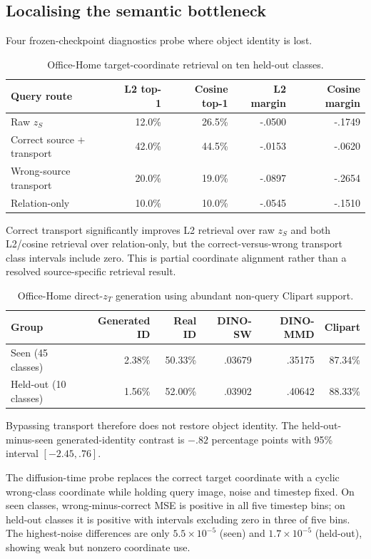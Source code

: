 \subsection{Localising the semantic bottleneck}
Four frozen-checkpoint diagnostics probe where object identity is lost.

\begin{table}[h]
\centering\small
\caption{Office-Home target-coordinate retrieval on ten held-out classes.}
\begin{tabular}{lrrrr}
\toprule
Query route & L2 top-1 & Cosine top-1 & L2 margin & Cosine margin\\
\midrule
Raw $z_S$ & 12.0\% & 26.5\% & -.0500 & -.1749\\
Correct source $+$ transport & 42.0\% & 44.5\% & -.0153 & -.0620\\
Wrong-source transport & 20.0\% & 19.0\% & -.0897 & -.2654\\
Relation-only & 10.0\% & 10.0\% & -.0545 & -.1510\\
\bottomrule
\end{tabular}
\end{table}

Correct transport significantly improves L2 retrieval over raw $z_S$ and both L2/cosine retrieval over relation-only, but the correct-versus-wrong transport class intervals include zero. This is partial coordinate alignment rather than a resolved source-specific retrieval result.

\begin{table}[h]
\centering\small
\caption{Office-Home direct-$z_T$ generation using abundant non-query Clipart support.}
\begin{tabular}{lrrrrr}
\toprule
Group & Generated ID & Real ID & DINO-SW & DINO-MMD & Clipart\\
\midrule
Seen (45 classes) & 2.38\% & 50.33\% & .03679 & .35175 & 87.34\%\\
Held-out (10 classes) & 1.56\% & 52.00\% & .03902 & .40642 & 88.33\%\\
\bottomrule
\end{tabular}
\end{table}

Bypassing transport therefore does not restore object identity. The held-out-minus-seen generated-identity contrast is $-.82$ percentage points with 95\% interval $[-2.45,.76]$.

The diffusion-time probe replaces the correct target coordinate with a cyclic wrong-class coordinate while holding query image, noise and timestep fixed. On seen classes, wrong-minus-correct MSE is positive in all five timestep bins; on held-out classes it is positive with intervals excluding zero in three of five bins. The highest-noise differences are only $5.5\times10^{-5}$ (seen) and $1.7\times10^{-5}$ (held-out), showing weak but nonzero coordinate use.

